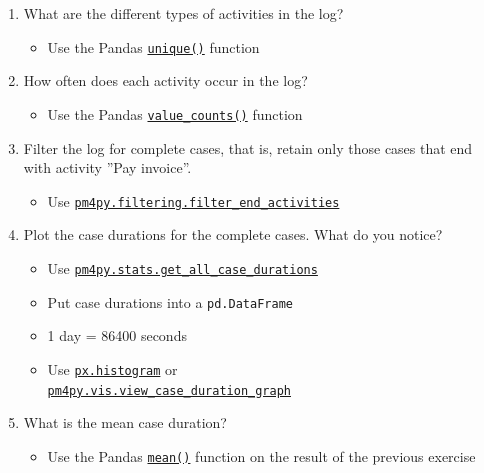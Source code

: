 \begin{withcode}
\begin{exerciseboxcomputer}
\begin{enumerate}
    \item What are the different types of activities in the log?
    \begin{itemize}
       \item Use the Pandas \href{https://pandas.pydata.org/docs/reference/api/pandas.unique.html}{\texttt{unique()}} function
    \end{itemize}
    \item How often does each activity occur in the log?
    \begin{itemize}
       \item Use the Pandas \href{https://pandas.pydata.org/pandas-docs/stable/reference/api/pandas.Series.value_counts.html}{\texttt{value\_counts()}} function
    \end{itemize}
    \item Filter the log for complete cases, that is, retain only those cases that end with activity ''Pay invoice''.
    \begin{itemize}
       \item Use \href{https://processintelligence.solutions/static/api/2.7.11/generated/pm4py.filtering.filter_end_activities.html}{\texttt{pm4py.filtering.filter\_end\_activities}}
    \end{itemize}
    \item Plot the case durations for the complete cases. What do you notice?
    \begin{itemize}
       \item Use \href{https://processintelligence.solutions/static/api/2.7.11/generated/pm4py.stats.get_all_case_durations.html}{\texttt{pm4py.stats.get\_all\_case\_durations}}
       \item Put case durations into a \texttt{pd.DataFrame}
       \item 1 day = 86400 seconds
       \item Use \href{https://plotly.com/python/histograms/}{\texttt{px.histogram}} or \\ \href{https://processintelligence.solutions/static/api/2.7.11/generated/pm4py.vis.view_case_duration_graph.html}{\texttt{pm4py.vis.view\_case\_duration\_graph}}
    \end{itemize}
    \item What is the mean case duration?
    \begin{itemize}
       \item Use the Pandas \href{https://pandas.pydata.org/docs/reference/api/pandas.DataFrame.mean.html}{\texttt{mean()}} function on the result of the previous exercise
    \end{itemize}
\end{enumerate}
\end{exerciseboxcomputer}


\end{withcode}
